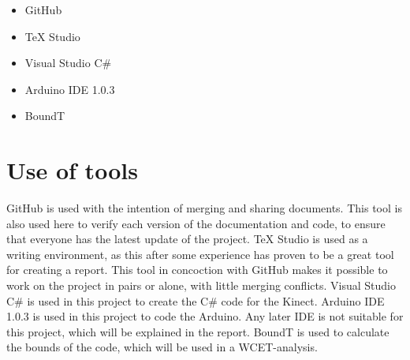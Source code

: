 \begin{itemize}
	\item GitHub
	\item TeX Studio
	\item Visual Studio C\#
	\item Arduino IDE 1.0.3
	\item BoundT
\end{itemize}

\section{Use of tools}
GitHub is used with the intention of merging and sharing documents. This tool is also used here to verify each version of the documentation and code, to ensure that everyone has the latest update of the project.
TeX Studio is used as a writing environment, as this after some experience has proven to be a great tool for creating a report. This tool in concoction with GitHub makes it possible to work on the project in pairs or alone, with little merging conflicts.
Visual Studio C\# is used in this project to create the C\# code for the Kinect.
Arduino IDE 1.0.3 is used in this project to code the Arduino. Any later IDE is not suitable for this project, which will be explained in the report.
BoundT is used to calculate the bounds of the code, which will be used in a WCET-analysis.